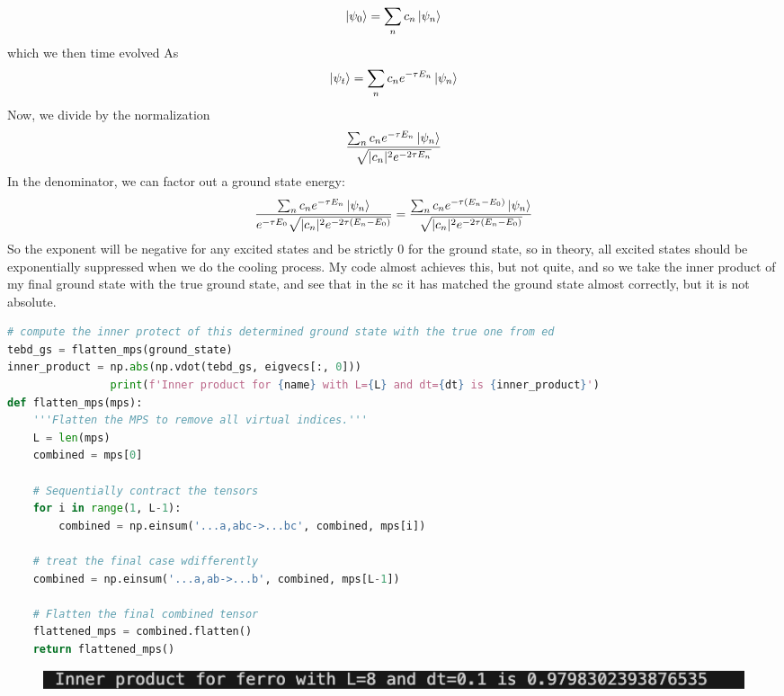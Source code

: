 \documentclass[12pt]{article}
\begin{document}
\begin{equation}
  \ket{\psi _0} = \sum_{n} c_n \ket{\psi _n}
\end{equation}
which we then time evolved As
\begin{equation}
  \ket{\psi _t} = \sum_{n} c_n e^{-\tau E_n} \ket{\psi _n}
\end{equation}
Now, we divide by the normalization
\begin{equation}
  \frac{\sum_{n} c_n e^{-\tau E_n} \ket{\psi _n}}{\sqrt{|c_n|^2 e^{-2\tau E_n}}}
\end{equation}
In the denominator, we can factor out a ground state energy:
\begin{equation}
  \frac{\sum_{n} c_n e^{-\tau E_n} \ket{\psi _n}}{e^{-\tau E_0} \sqrt{|c_n|^2 e^{-2\tau (E_n - E_0)}}} = \frac{\sum_{n} c_n e^{-\tau (E_n - E_0)} \ket{\psi _n}}{\sqrt{|c_n|^2 e^{-2\tau (E_n - E_0)}}}
\end{equation}
So the exponent will be negative for any excited states and be strictly 0 for the ground state, so in theory, all excited states should be exponentially suppressed when we do the cooling process. My code almost achieves this, but not quite, and so we take the inner product of my final ground state with the true ground state, and see that in the sc it has matched the ground state almost correctly, but it is not absolute.
\begin{lstlisting}[language=Python]
# compute the inner protect of this determined ground state with the true one from ed
tebd_gs = flatten_mps(ground_state)
inner_product = np.abs(np.vdot(tebd_gs, eigvecs[:, 0]))
                print(f'Inner product for {name} with L={L} and dt={dt} is {inner_product}')
def flatten_mps(mps):
    '''Flatten the MPS to remove all virtual indices.'''
    L = len(mps)
    combined = mps[0]

    # Sequentially contract the tensors
    for i in range(1, L-1):
        combined = np.einsum('...a,abc->...bc', combined, mps[i])

    # treat the final case wdifferently
    combined = np.einsum('...a,ab->...b', combined, mps[L-1])

    # Flatten the final combined tensor
    flattened_mps = combined.flatten()
    return flattened_mps()
\end{lstlisting}
\begin{figure}
  \includegraphics{inner_p.png}
\end{figure}
\end{document}
